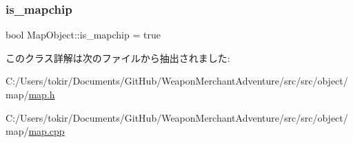 \subsubsection{\texorpdfstring{is\+\_\+mapchip}{is\_mapchip}}
{\footnotesize\ttfamily bool Map\+Object\+::is\+\_\+mapchip = true}



このクラス詳解は次のファイルから抽出されました\+:\begin{DoxyCompactItemize}
\item 
C\+:/\+Users/tokir/\+Documents/\+Git\+Hub/\+Weapon\+Merchant\+Adventure/src/src/object/map/\mbox{\hyperlink{map_8h}{map.\+h}}\item 
C\+:/\+Users/tokir/\+Documents/\+Git\+Hub/\+Weapon\+Merchant\+Adventure/src/src/object/map/\mbox{\hyperlink{map_8cpp}{map.\+cpp}}\end{DoxyCompactItemize}
